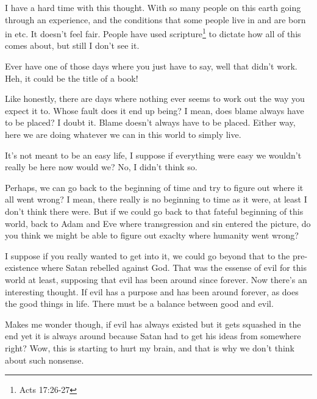 I have a hard time with this thought. With so many people on this earth going through
an experience, and the conditions that some people live in and are born in etc. It
doesn't feel fair. People have used scripture\footnote{Acts 17:26-27} to dictate how 
all of this comes about, but still I don't see it.

Ever have one of those days where you just have to say, well that didn't work. Heh,
it could be the title of a book!

Like honestly, there are days where nothing ever seems to work out the way you expect
it to. Whose fault does it end up being? I mean, does blame always have to be placed?
I doubt it. Blame doesn't always have to be placed. Either way, here we are doing
whatever we can in this world to simply live.

It's not meant to be an easy life, I suppose if everything were easy we wouldn't
really be here now would we? No, I didn't think so.

Perhaps, we can go back to the beginning of time and try to figure out where it all
went wrong? I mean, there really is no beginning to time as it were, at least I don't
think there were. But if we could go back to that fateful beginning of this world,
back to Adam and Eve where transgression and sin entered the picture, do you think we
might be able to figure out exaclty where humanity went wrong?

I suppose if you really wanted to get into it, we could go beyond that to the
pre-existence where Satan rebelled against God. That was the essense of evil for this
world at least, supposing that evil has been around since forever. Now there's an
interesting thought. If evil has a purpose and has been around forever, as does the
good things in life. There must be a balance between good and evil.

Makes me wonder though, if evil has always existed but it gets squashed in the end
yet it is always around because Satan had to get his ideas from somewhere right? Wow,
this is starting to hurt my brain, and that is why we don't think about such
nonsense.